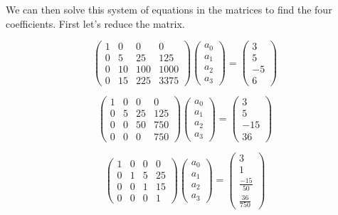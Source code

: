 \documentclass[]{article}
\begin{document}
We can then solve this system of equations in the matrices to find the
four coefficients. First let's reduce the matrix.

\[
\left(\begin{array}{cccc} 
1&0&0&0\\
0&5&25&125\\
0&10&100&1000\\
0&15&225&3375
\end{array}\right)
\left(\begin{array}{c} 
a_0 \\
a_1 \\
a_2 \\
a_3
\end{array}\right) =
\left(\begin{array}{c}
3 \\
5 \\
-5 \\
6
\end{array}\right)
\]

\[
\left(\begin{array}{cccc} 
1&0&0&0\\
0&5&25&125\\
0&0&50&750\\
0&0&0&750
\end{array}\right)
\left(\begin{array}{c} 
a_0 \\
a_1 \\
a_2 \\
a_3
\end{array}\right) =
\left(\begin{array}{c}
3 \\
5 \\
-15 \\
36
\end{array}\right)
\]

\[
\left(\begin{array}{cccc} 
1&0&0&0\\
0&1&5&25\\
0&0&1&15\\
0&0&0&1
\end{array}\right)
\left(\begin{array}{c} 
a_0 \\
a_1 \\
a_2 \\
a_3
\end{array}\right) =
\left(\begin{array}{c}
3 \\
1 \\
\frac{-15}{50} \\
\frac{36}{750}
\end{array}\right)
\]
\end{document}
